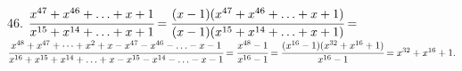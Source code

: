 46. $\cfrac{x^{47}+x^{46}+\ldots+x+1}{x^{15}+x^{14}+\ldots+x+1}=\cfrac{(x-1)(x^{47}+x^{46}+\ldots+x+1)}{(x-1)(x^{15}+x^{14}+\ldots+x+1)}=$\\$
\cfrac{x^{48}+x^{47}+\cdots+x^2+x-x^{47}-x^{46}-\ldots-x-1}{x^{16}+x^{15}+x^{14}+\ldots+x-x^{15}-x^{14}-\ldots-x-1}=\cfrac{x^{48}-1}{x^{16}-1}=
\cfrac{(x^{16}-1)(x^{32}+x^{16}+1)}{x^{16}-1}=x^{32}+x^{16}+1.$\\
